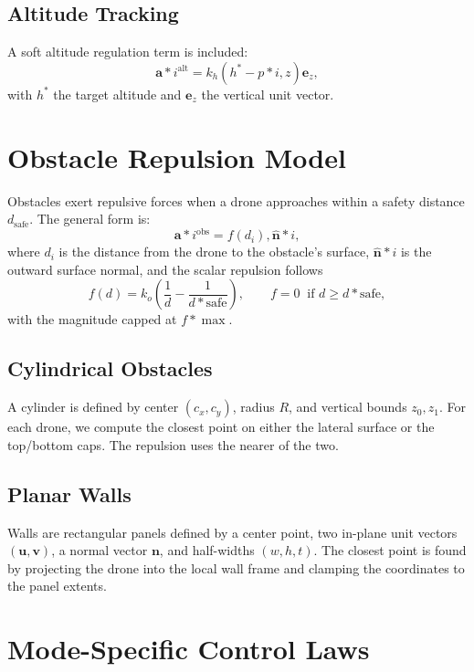 \documentclass[12pt]{article}
\begin{document}
\subsection{Altitude Tracking}
A soft altitude regulation term is included:
\begin{equation}
\mathbf{a}*i^{\mathrm{alt}} = k_h (h^* - p*{i,z}) \mathbf{e}_z,
\end{equation}
with $h^*$ the target altitude and $\mathbf{e}_z$ the vertical unit vector.

\section{Obstacle Repulsion Model}
Obstacles exert repulsive forces when a drone approaches within a safety distance $d_\mathrm{safe}$. The general form is:
\begin{equation}
\mathbf{a}*i^{\mathrm{obs}} = f(d_i), \hat{\mathbf{n}}*i,
\end{equation}
where $d_i$ is the distance from the drone to the obstacle's surface, $\hat{\mathbf{n}}*i$ is the outward surface normal, and the scalar repulsion follows
\begin{equation}
f(d) = k_o \left(\frac{1}{d} - \frac{1}{d*\mathrm{safe}}\right), \qquad f = 0\ \text{ if } d \ge d*\mathrm{safe},
\end{equation}
with the magnitude capped at $f*{\max}$.

\subsection{Cylindrical Obstacles}
A cylinder is defined by center $(c_x,c_y)$, radius $R$, and vertical bounds $z_0, z_1$. For each drone, we compute the closest point on either the lateral surface or the top/bottom caps. The repulsion uses the nearer of the two.

\subsection{Planar Walls}
Walls are rectangular panels defined by a center point, two in-plane unit vectors $(\mathbf{u}, \mathbf{v})$, a normal vector $\mathbf{n}$, and half-widths $(w,h,t)$. The closest point is found by projecting the drone into the local wall frame and clamping the coordinates to the panel extents.

\section{Mode-Specific Control Laws}
\end{document}
